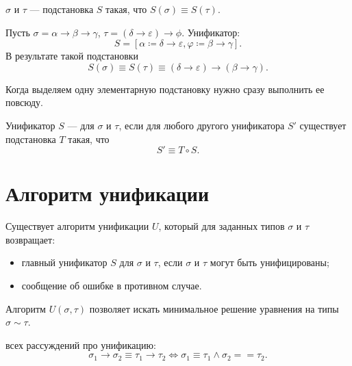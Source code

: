 \documentclass[11pt,a4paper]{article}
\begin{document}
\begin{defn}[Унификатор]
	 $ \sigma $ и $ \tau $ --- подстановка $ S$ такая, что $ S( \sigma ) \equiv S( \tau )$.
\end{defn}
\begin{ex}
	Пусть $ \sigma  = \alpha \to \beta \to \gamma $, $ \tau  = (\delta \to  \varepsilon ) \to  \phi$.
	Унификатор:
	\[
		S = [ \alpha \coloneqq \delta \to  \varepsilon , \varphi \coloneqq \beta \to \gamma ]
	.\] 
	В результате такой подстановки
	\[
		S( \sigma ) \equiv S( \tau ) \equiv ( \delta \to \varepsilon ) \to (\beta \to \gamma )
	.\] 
\end{ex}
Когда выделяем одну элементарную подстановку нужно сразу выполнить ее повсюду.

\begin{defn}
	Унификатор $ S$ ---  для $ \sigma $ и $ \tau $, если для любого другого унификатора $ S'$ существует подстановка $ T$ такая,  что
	\[
	S' \equiv T \circ S 
	.\] 
\end{defn}


\section{Алгоритм унификации}
\begin{thm}[Робинсон, 1965]
    Существует алгоритм унификации $U$, который для заданных типов $ \sigma $ и $ \tau $ возвращает:
	\begin{itemize}
		\item главный унификатор $ S$ для $\sigma$ и $ \tau $, если $ \sigma $ и $ \tau $ могут быть унифицированы;
		\item сообщение об ошибке в противном случае.
	\end{itemize}
\end{thm}
Алгоритм $ U( \sigma , \tau )$ позволяет искать минимальное решение уравнения на типы $ \sigma \sim \tau $.

 всех рассуждений про унификацию:
\[
\sigma _1 \to \sigma _2 \equiv \tau _1 \to  \tau _2 \Longleftrightarrow \sigma _1 \equiv \tau _1 \wedge \sigma _2 == \tau _2
.\] 
\end{document}
